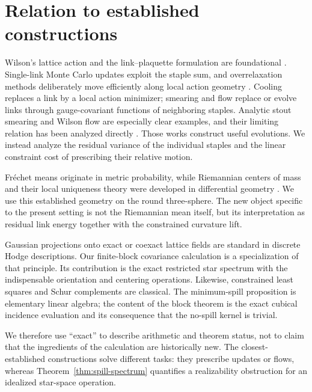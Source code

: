 \section{Relation to established constructions}
\label{sec:related}

Wilson's lattice action and the link--plaquette formulation are foundational
\cite{Wilson1974,Kogut1983}.  Single-link Monte Carlo updates exploit the
staple sum, and overrelaxation methods deliberately move efficiently along
local action geometry \cite{Adler1981,BrownWoch1987}.  Cooling replaces a link
by a local action minimizer; smearing and flow replace or evolve links through
gauge-covariant functions of neighboring staples.  Analytic stout smearing
\cite{MorningstarPeardon2004} and Wilson flow \cite{Luscher2010} are especially
clear examples, and their limiting relation has been analyzed directly
\cite{NagatsukaSakaiSasaki2023}.  Those works construct useful evolutions.  We
instead analyze the residual variance of the individual staples and the
linear constraint cost of prescribing their relative motion.

Fr\'echet means originate in metric probability, while Riemannian centers of
mass and their local uniqueness theory were developed in differential
geometry \cite{Frechet1948,Karcher1977,Afsari2011}.  We use this established
geometry on the round three-sphere.  The new object specific to the present
setting is not the Riemannian mean itself, but its interpretation as residual
link energy together with the constrained curvature lift.

Gaussian projections onto exact or coexact lattice fields are standard in
discrete Hodge descriptions.  Our finite-block covariance calculation is a
specialization of that principle.  Its contribution is the exact restricted
star spectrum with the indispensable orientation and centering operations.
Likewise, constrained least squares and Schur complements are classical.  The
minimum-spill proposition is elementary linear algebra; the content of the
block theorem is the exact cubical incidence evaluation and its consequence
that the no-spill kernel is trivial.

We therefore use ``exact'' to describe arithmetic and theorem status, not to
claim that the ingredients of the calculation are historically new.  The
closest-established constructions solve different tasks: they prescribe
updates or flows, whereas Theorem~\ref{thm:spill-spectrum} quantifies a
realizability obstruction for an idealized star-space operation.
